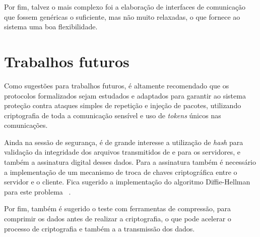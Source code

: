     Por fim, talvez o mais complexo foi a elaboração de interfaces de comunicação que fossem genéricas o suficiente, mas não muito relaxadas, o que fornece ao sistema uma boa flexibilidade.
    
    \section{Trabalhos futuros}
    
    Como sugestões para trabalhos futuros, é altamente recomendado que os protocolos formalizados sejam estudados e adaptados para garantir ao sistema proteção contra ataques simples de repetição e injeção de pacotes, utilizando criptografia de toda a comunicação sensível e uso de \textit{tokens} únicos nas comunicações.
    
    Ainda na sessão de segurança, é de grande interesse a utilização de \textit{hash} para validação da integridade dos arquivos transmitidos de e para os servidores, e também a assinatura digital desses dados. Para a assinatura também é necessário a implementação de um mecanismo de troca de chaves criptográfica entre o servidor e o cliente. Fica sugerido a implementação do algoritmo Diffie-Hellman  para este problema ~\cite{merkle1978secure}.
    
    Por fim, também é sugerido o teste com ferramentas de compressão, para comprimir os dados antes de realizar a criptografia, o que pode acelerar o processo de criptografia e também a a transmissão dos dados.